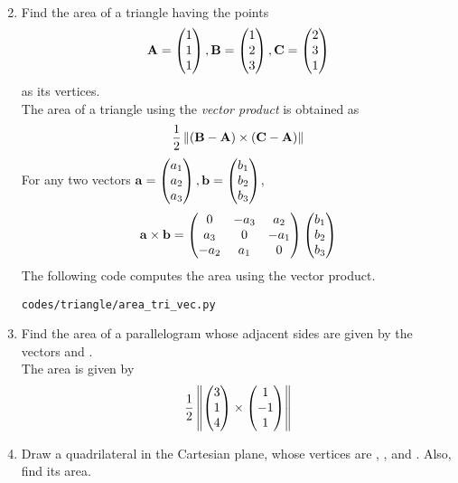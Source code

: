 \documentclass[journal,12pt,twocolumn]{IEEEtran}
\renewcommand\thesection{\arabic{section}}
\begin{document}
\begin{enumerate}[label=\thesection.\arabic*.,ref=\thesection.\theenumi]
\begin{align}
\end{align}
%
\item Find the area of a triangle having the points
%
\begin{align}
\mathbf{A} = \begin{pmatrix}1\\1 \\1\end{pmatrix},
\mathbf{B} = \begin{pmatrix}1\\2 \\3\end{pmatrix},
\mathbf{C} = \begin{pmatrix}2\\ 3\\1\end{pmatrix}
\end{align}
%
as its vertices.
\\
\solution The area of a triangle using the {\em vector product} is obtained as
\begin{align}
\frac{1}{2}\left\lVert\left(\mathbf{B}-\mathbf{A}\right)\times \left(\mathbf{C}-\mathbf{A}\right)\right\rVert
\end{align}
%
For any two vectors $\mathbf{a}=\begin{pmatrix}a_1\\a_2\\a_3\end{pmatrix}, \mathbf{b}=\begin{pmatrix}b_1\\b_2\\b_3\end{pmatrix}$, 
\begin{align}
\label{eq:tri_cross_prod}
\mathbf{a}\times \mathbf{b} = \begin{pmatrix}0 & -a_3 & a_2 \\ a_3 & 0 & -a_1 \\ -a_2 & a_1 & 0\end{pmatrix}\begin{pmatrix}b_1\\b_2\\b_3\end{pmatrix}
\end{align}
%
The following code computes the area using the vector product.
%
\begin{lstlisting}
codes/triangle/area_tri_vec.py
\end{lstlisting}
%
\item Find the area of a parallelogram whose adjacent sides are given by the vectors  and .
%
\\
\solution  The area is given by 
%
\begin{align}
\frac{1}{2}\left\lVert\begin{pmatrix}3\\1\\4\end{pmatrix} \times \begin{pmatrix}1\\-1\\1\end{pmatrix}\right\rVert
\end{align}
\item Draw a quadrilateral in the Cartesian plane, whose vertices are , ,  and . Also, find its area.
\\
\solution
%


\end{enumerate}
\end{document}
